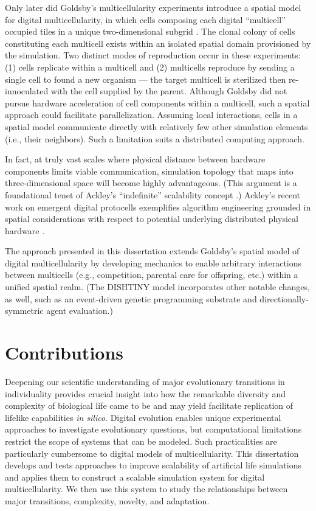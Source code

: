 Only later did Goldsby's multicellularity experiments introduce a spatial model for digital multicellularity, in which cells composing each digital ``multicell'' occupied tiles in a unique two-dimensional subgrid \citep{goldsby2014evolutionary}.
The clonal colony of cells constituting each multicell exists within an isolated spatial domain provisioned by the simulation.
Two distinct modes of reproduction occur in these experiments:
(1) cells replicate within a multicell and
(2) multicells reproduce by sending a single cell to found a new organism --- the target multicell is sterilized then re-innoculated with the cell supplied by the parent.
Although Goldsby did not pursue hardware acceleration of cell components within a multicell, such a spatial approach could facilitate parallelization.
Assuming local interactions, cells in a spatial model communicate directly with relatively few other simulation elements (i.e., their neighbors).
Such a limitation suits a distributed computing approach.

In fact, at truly vast scales where physical distance between hardware components limits viable communication, simulation topology that maps into three-dimensional space will become highly advantageous.
(This argument is a foundational tenet of Ackley's ``indefinite'' scalability concept \citep{ackley2011pursue}.)
Ackley's recent work on emergent digital protocells exemplifies algorithm engineering grounded in spatial considerations with respect to potential underlying distributed physical hardware \citep{ackley2018digital,ackley2019building}.

The approach presented in this dissertation extends Goldsby's spatial model of digital multicellularity by developing mechanics to enable arbitrary interactions between multicells (e.g., competition, parental care for offspring, etc.) within a unified spatial realm.
(The DISHTINY model incorporates other notable changes, as well, such as an event-driven genetic programming substrate and directionally-symmetric agent evaluation.)

\section{Contributions}

Deepening our scientific understanding of major evolutionary transitions in individuality provides crucial insight into how the remarkable diversity and complexity of biological life came to be and may yield facilitate replication of lifelike capabilities \textit{in silico}.
Digital evolution enables unique experimental approaches to investigate evolutionary questions, but computational limitations restrict the scope of systems that can be modeled.
Such practicalities are particularly cumbersome to digital models of multicellularity.
This dissertation develops and tests approaches to improve scalability of artificial life simulations and applies them to construct a scalable simulation system for digital multicellularity.
We then use this system to study the relationships between major transitions, complexity, novelty, and adaptation.

